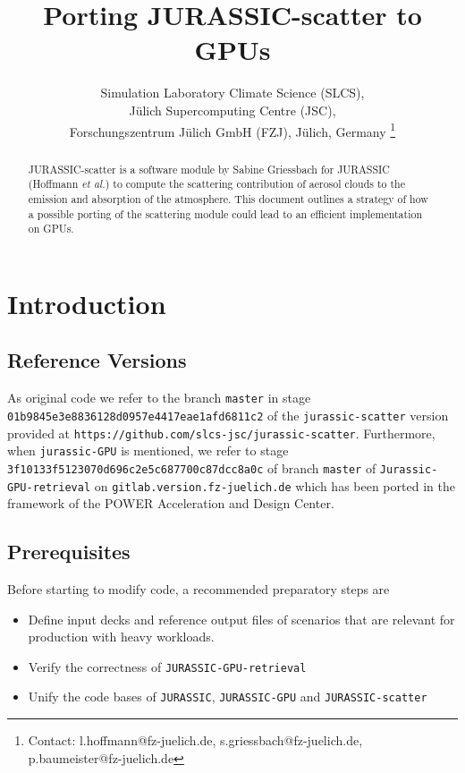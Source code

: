 \documentclass[12pt,a4paper,titlepage,twoside]{article}
\newcommand{\ttt}[1]{\texttt{#1}}
\begin{document}

\author{Simulation Laboratory Climate Science (SLCS),\\
  J\"u{}lich Supercomputing Centre (JSC),\\ Forschungszentrum J\"u{}lich GmbH (FZJ), J\"u{}lich, Germany \footnote{Contact: l.hoffmann@fz-juelich.de, s.griessbach@fz-juelich.de, p.baumeister@fz-juelich.de}}
\title{Porting JURASSIC-scatter to GPUs}

\maketitle

\begin{abstract}
JURASSIC-scatter is a software module by Sabine Griessbach for 
JURASSIC (Hoffmann \emph{et al.}) to compute
the scattering contribution of aerosol clouds
to the emission and absorption of the atmosphere.
This document outlines a strategy of how a possible porting
of the scattering module could lead to an efficient implementation on GPUs.
\end{abstract}

\tableofcontents

\section{Introduction}\label{sec:intro}

\subsection{Reference Versions}
As original code we refer to the branch \ttt{master} in stage\\ \ttt{01b9845e3e8836128d0957e4417eae1afd6811c2} 
of the \ttt{jurassic-scatter} version provided at 
\ttt{https://github.com/slcs-jsc/jurassic-scatter}.
Furthermore, when \ttt{jurassic-GPU} is mentioned, we refer
to stage\\
\ttt{3f10133f5123070d696c2e5c687700c87dcc8a0c} of branch \ttt{master}
of \ttt{Jurassic-GPU-retrieval} on \ttt{gitlab.version.fz-juelich.de}
which has been ported in the framework of the 
POWER Acceleration and Design Center.

\subsection{Prerequisites}
Before starting to modify code, a recommended
preparatory steps are
\begin{itemize}
\item Define input decks and reference output files of scenarios that are relevant for production with heavy workloads.
\item Verify the correctness of \ttt{JURASSIC-GPU-retrieval}
\item Unify the code bases of \ttt{JURASSIC}, \ttt{JURASSIC-GPU} and \ttt{JURASSIC-scatter}
\end{itemize}
\end{document}
